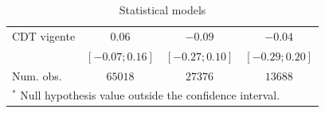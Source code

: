 \begin{table}
\begin{center}
\begin{tabular}{l c c c}
CDT vigente                 & $0.06$              & $-0.09$             & $-0.04$            \\
                            & $ [ -0.07;   0.16]$ & $ [ -0.27;   0.10]$ & $ [ -0.29;  0.20]$ \\
\hline
Num. obs.                   & $65018$             & $27376$             & $13688$            \\
\hline
\multicolumn{4}{l}{\scriptsize{$^*$ Null hypothesis value outside the confidence interval.}}
\end{tabular}
\caption{Statistical models}
\label{table:coefficients}
\end{center}
\end{table}
